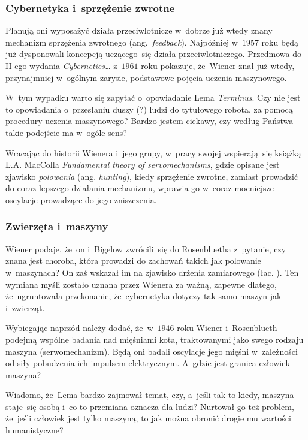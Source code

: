 \documentclass[10pt,t]{beamer}
\begin{document}
\begin{frame}
  \frametitle{Cybernetyka i~sprzężenie zwrotne}


  Planują oni wyposażyć działa przeciwlotnicze w~dobrze już wtedy znany
  mechanizm sprzężenia zwrotnego (ang.~\textit{feedback}). Najpóźniej
  w~$1957$ roku będą już dysponowali koncepcją uczącego~się działa
  przeciwlotniczego. Przedmowa do II-ego wydania \textit{Cybernetics\ldots}
  z~$1961$ roku pokazuje, że~Wiener znał już wtedy, przynajmniej w~ogólnym
  zarysie, podstawowe pojęcia uczenia maszynowego.

  W~tym wypadku warto się zapytać o~opowiadanie Lema \textit{Terminus}.
  Czy nie jest to opowiadania o~przesłaniu duszy (?) ludzi do
  tytułowego robota, za pomocą procedury uczenia maszynowego? Bardzo
  jestem ciekawy, czy według Państwa takie podejście ma w~ogóle sens?

  Wracając do historii Wienera i~jego grupy, w~pracy swojej wspierają~się
  książką L.A. MacColla
  {\textit{Fundamental theory of servomechanisms}}, gdzie opisane jest
  zjawisko \textit{polowania} (ang. \textit{hunting}), kiedy
  sprzężenie zwrotne, zamiast prowadzić do coraz lepszego działania
  mechanizmu, wprawia go w~coraz mocniejsze oscylacje prowadzące do jego
  zniszczenia.

\end{frame}





\begin{frame}
  \frametitle{Zwierzęta i~maszyny}


  Wiener podaje, że~on i~Bigelow zwrócili~się do Rosenbluetha z~pytanie, czy
  znana jest choroba, która prowadzi do zachowań takich jak polowanie
  w~maszynach? On zaś wskazał im na zjawisko drżenia zamiarowego
  (łac.
  ). Ten wymiana myśli zostało uznana przez Wienera za
  ważną, zapewne dlatego, że~ugruntowała przekonanie, że~cybernetyka dotyczy
  tak samo maszyn jak i~zwierząt.

  Wybiegając naprzód należy dodać, że~w~$1946$ roku Wiener i~Rosenblueth
  podejmą wspólne badania nad mięśniami kota, traktowanymi jako swego
  rodzaju maszyna (serwomechanizm). Będą oni badali oscylacje jego mięśni
  w~zależności od siły pobudzenia ich impulsem elektrycznym.
  A~gdzie jest granica człowiek-maszyna?

  Wiadomo, że~Lema bardzo zajmował temat, czy, a~jeśli tak to kiedy,
  maszyna staje~się osobą i~co to przemiana oznacza dla ludzi? Nurtował go
  też problem, że~jeśli człowiek jest tylko maszyną, to jak można obronić
  drogie mu wartości humanistyczne?

\end{frame}
\end{document}

